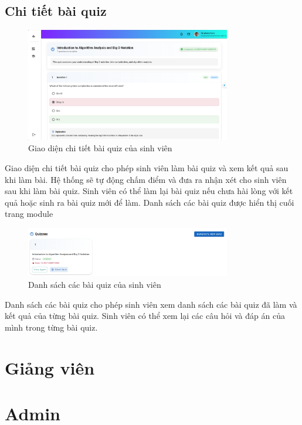 \subsection{Chi tiết bài quiz}
\begin{figure}[H]
    \centering
    \includegraphics[width=0.8\textwidth]{images/CapScreen_Student/Quiz.png}
    \caption{Giao diện chi tiết bài quiz của sinh viên}
    \label{fig:quiz_detail_page}
\end{figure}
Giao diện chi tiết bài quiz cho phép sinh viên làm bài quiz và xem kết quả sau khi làm bài. Hệ thống sẽ tự động chấm điểm và đưa ra nhận xét cho sinh viên sau khi làm bài quiz. Sinh viên có thể làm lại bài quiz nếu chưa hài lòng với kết quả hoặc sinh ra bài quiz mới để làm. Danh sách các bài quiz được hiển thị cuối trang module
\begin{figure}[H]
    \centering
    \includegraphics[width=0.8\textwidth]{images/CapScreen_Student/ViewQuiz.png}
    \caption{Danh sách các bài quiz của sinh viên}
    \label{fig:quiz_list_page}
\end{figure}
Danh sách các bài quiz cho phép sinh viên xem danh sách các bài quiz đã làm và kết quả của từng bài quiz. Sinh viên có thể xem lại các câu hỏi và đáp án của mình trong từng bài quiz.

\section{Giảng viên}
\section{Admin}
